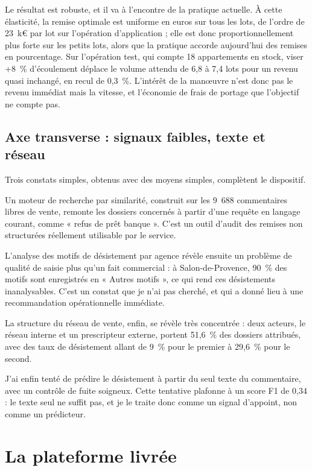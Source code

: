 Le résultat est robuste, et il va à l'encontre de la pratique actuelle. À cette élasticité, la
remise optimale est uniforme en euros sur tous les lots, de l'ordre de 23~k€ par lot sur
l'opération d'application ; elle est donc proportionnellement plus forte sur les petits lots,
alors que la pratique accorde aujourd'hui des remises en pourcentage. Sur l'opération test, qui
compte 18 appartements en stock, viser +8~\% d'écoulement déplace le volume attendu de 6,8 à 7,4
lots pour un revenu quasi inchangé, en recul de 0,3~\%. L'intérêt de la manœuvre n'est donc pas
le revenu immédiat mais la vitesse, et l'économie de frais de portage que l'objectif ne compte
pas.

\subsection{Axe transverse : signaux faibles, texte et réseau}

Trois constats simples, obtenus avec des moyens simples, complètent le dispositif.

Un moteur de recherche par similarité, construit sur les 9~688 commentaires libres de vente,
remonte les dossiers concernés à partir d'une requête en langage courant, comme « refus de prêt
banque ». C'est un outil d'audit des remises non structurées réellement utilisable par le
service.

L'analyse des motifs de désistement par agence révèle ensuite un problème de qualité de saisie
plus qu'un fait commercial : à Salon-de-Provence, 90~\% des motifs sont enregistrés en « Autres
motifs », ce qui rend ces désistements inanalysables. C'est un constat que je n'ai pas cherché,
et qui a donné lieu à une recommandation opérationnelle immédiate.

La structure du réseau de vente, enfin, se révèle très concentrée : deux acteurs, le réseau
interne et un prescripteur externe, portent 51,6~\% des dossiers attribués, avec des taux de
désistement allant de 9~\% pour le premier à 29,6~\% pour le second.

J'ai enfin tenté de prédire le désistement à partir du seul texte du commentaire, avec un
contrôle de fuite soigneux. Cette tentative plafonne à un score F1 de 0,34 : le texte seul ne
suffit pas, et je le traite donc comme un signal d'appoint, non comme un prédicteur.

\section{La plateforme livrée}

